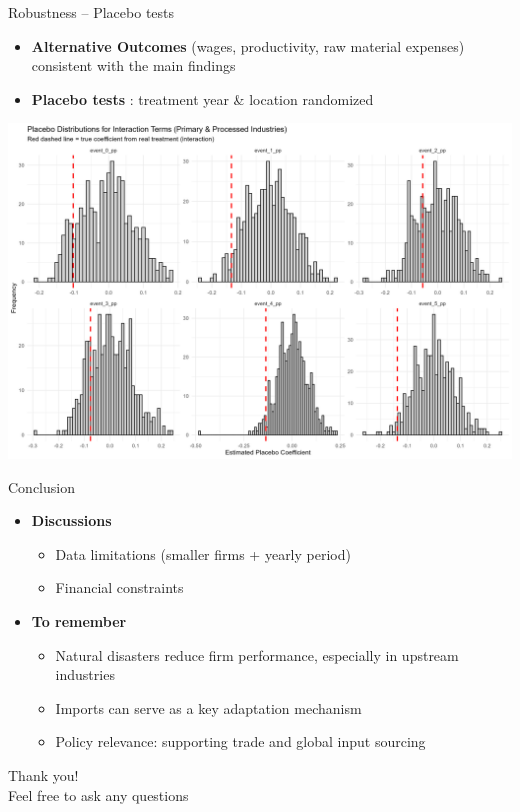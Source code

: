 \documentclass[
  xcolor=svgnames,
  bookmarks=true,
  bookmarksopen=true,
  pdfborder={0 0 0},
  pdfhighlight={/N},
  linkbordercolor={rgb}{0.5,0.5,0.5},
  implicit=false,
  colorlinks=true,
  allcolors=deepblue
]{beamer}
\begin{document}
\begin{frame}{Robustness -- Placebo tests}
\begin{itemize}
    \item \textbf{Alternative Outcomes} (wages, productivity, raw material expenses) consistent with the main findings
    \item \textbf{Placebo tests} \citep{Hagemann2019}: treatment year \& location randomized
\end{itemize}
\centering
\includegraphics[height=5 cm]{Placebo distrib.png}
\end{frame}

\begin{frame}{Conclusion}
\begin{itemize}
\item \textbf{Discussions}
\begin{itemize}
    \item Data limitations (smaller firms + yearly period)
    \item Financial constraints
\end{itemize}
\item \textbf{To remember}
\begin{itemize}
    \item Natural disasters reduce firm performance, especially in upstream industries
    \item Imports can serve as a key adaptation mechanism
    \item Policy relevance: supporting trade and global input sourcing
\end{itemize}
\end{itemize}
\end{frame}

\begin{frame}
    \centering
    \Large Thank you!\\
    Feel free to ask any questions
\end{frame}
\end{document}
